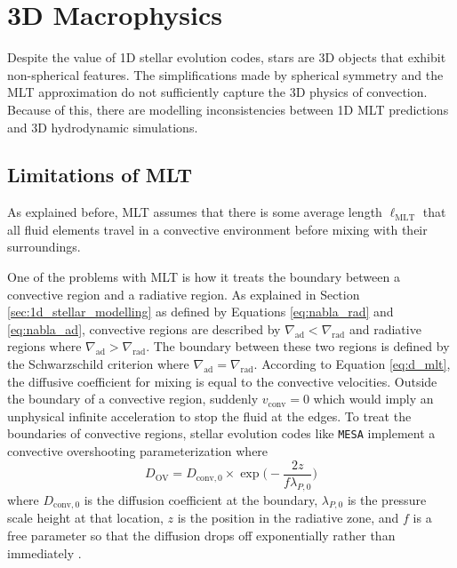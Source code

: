 \section{3D Macrophysics}

Despite the value of 1D stellar evolution codes, stars are 3D objects that exhibit non-spherical features.
The simplifications made by spherical symmetry and the MLT approximation do not sufficiently capture the 3D physics of convection.
Because of this, there are modelling inconsistencies between 1D MLT predictions and 3D hydrodynamic simulations.

\subsection{Limitations of MLT}\label{sec:mlt_limitations}

As explained before, MLT assumes that there is some average length $\ell_{\mathrm{MLT}}$ that all fluid elements travel in a convective environment before mixing with their surroundings.

One of the problems with MLT is how it treats the boundary between a convective region and a radiative region.
As explained in Section \ref{sec:1d_stellar_modelling} as defined by Equations \ref{eq:nabla_rad} and \ref{eq:nabla_ad}, convective regions are described by $\nabla_{\mathrm{ad}} < \nabla_{\mathrm{rad}}$ and radiative regions where $\nabla_{\mathrm{ad}} > \nabla_{\mathrm{rad}}$.
The boundary between these two regions is defined by the Schwarzschild criterion where $\nabla_{\mathrm{ad}} = \nabla_{\mathrm{rad}}$.
According to Equation \ref{eq:d_mlt}, the diffusive coefficient for mixing is equal to the convective velocities.
Outside the boundary of a convective region, suddenly $v_{\mathrm{conv}} = 0$ which would imply an unphysical infinite acceleration to stop the fluid at the edges.
To treat the boundaries of convective regions, stellar evolution codes like \texttt{MESA} implement a convective overshooting parameterization where 
\begin{equation}\label{eq:d_overshoot}
    D_{\mathrm{OV}} = D_{\mathrm{conv,0}}\times\exp{\Biggl(-\frac{2z}{f\lambda_{P,0}}\Biggr)}
\end{equation}
where $D_{\mathrm{conv,0}}$ is the diffusion coefficient at the boundary, $\lambda_{P,0}$ is the pressure scale height at that location, $z$ is the position in the radiative zone, and $f$ is a free parameter so that the diffusion drops off exponentially rather than immediately \citep{paxtonMODULESEXPERIMENTSLAR2010}.

